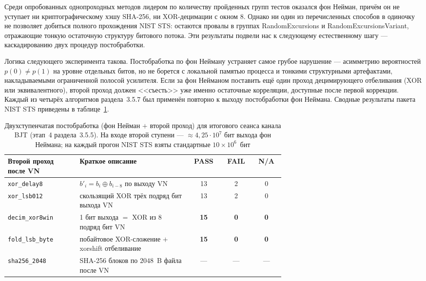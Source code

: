 Среди опробованных однопроходных методов лидером по количеству пройденных групп
тестов оказался фон Нейман, причём он не уступает ни криптографическому хэшу
SHA-256, ни XOR-децимации с окном 8. Однако ни один из перечисленных способов в
одиночку не позволяет добиться полного прохождения NIST STS: остаются провалы в
группах RandomExcursions и RandomExcursionsVariant, отражающие тонкую остаточную
структуру битового потока. Эти результаты подвели нас к следующему естественному
шагу --- каскадированию двух процедур постобработки.


Логика следующего эксперимента такова. Постобработка по фон Нейману устраняет
самое грубое нарушение --- асимметрию вероятностей $p(0)\neq p(1)$ на уровне
отдельных битов, но не борется с локальной памятью процесса и тонкими структурными
артефактами, накладываемыми ограниченной полосой усилителя. Если за фон Нейманом
поставить ещё один проход децимирующего отбеливания (XOR или эквивалентного),
второй проход должен <<съесть>> уже именно остаточные корреляции, доступные после
первой коррекции. Каждый из четырёх алгоритмов раздела~3.5.7 был применён повторно
к выходу постобработки фон Неймана. Сводные результаты пакета NIST STS
приведены в таблице~\ref{tab:bjt_postproc_after_vn}.

\begin{table}[H]
  \centering
  \scriptsize
  \setlength{\tabcolsep}{3pt}
  \caption{Двухступенчатая постобработка (фон Нейман $+$ второй проход) для
  итогового сеанса канала BJT (этап~4 раздела~3.5.5). На входе второй
  ступени --- $\approx 4{,}25\cdot 10^7$ бит выхода фон Неймана; на каждый
  прогон NIST STS взяты стандартные $10\times 10^6$~бит}
  \label{tab:bjt_postproc_after_vn}
  \begin{tabular}{|p{0.26\linewidth}|p{0.40\linewidth}|c|c|c|}
    \hline
    Второй проход после VN & Краткое описание & PASS & FAIL & N/A \\
    \hline
    \texttt{xor\_delay8} & $b'_i = b_i\oplus b_{i-8}$ по выходу VN & 13 & 2 & 0 \\
    \hline
    \texttt{xor\_lsb012} & скользящий XOR трёх подряд бит выхода VN & 13 & 2 & 0 \\
    \hline
    \texttt{decim\_xor8win} & 1 бит выхода $=$ XOR из 8 подряд бит VN & \textbf{15} & \textbf{0} & \textbf{0} \\
    \hline
    \texttt{fold\_lsb\_byte} & побайтовое XOR-сложение $+$ xorshift отбеливание & \textbf{15} & \textbf{0} & \textbf{0} \\
    \hline
    \texttt{sha256\_2048} & SHA-256 блоков по $2048$~B файла после VN & --- & --- & --- \\
    \hline
  \end{tabular}
\end{table}

